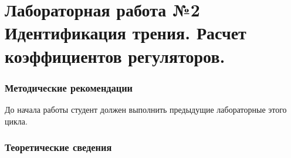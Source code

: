 \documentclass[12pt,a4paper,openany]{extarticle}
\begin{document}
\part*{Лабораторная работа №2\\ Идентификация трения. Расчет коэффициентов регуляторов.}%
\section{Методические рекомендации}
\hspace*{\parindent}До начала работы студент должен выполнить предыдущие лабораторные этого цикла.%

\section{Теоретические сведения}





\end{document}
